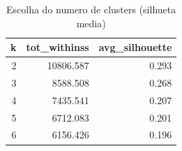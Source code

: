 \begin{table}

\caption{\label{tab:cluster_escolha_k}Escolha do numero de clusters (silhueta media)}
\centering
\begin{tabular}[t]{rrr}
\toprule
k & tot\_withinss & avg\_silhouette\\
\midrule
2 & 10806.587 & 0.293\\
3 & 8588.508 & 0.268\\
4 & 7435.541 & 0.207\\
5 & 6712.083 & 0.201\\
6 & 6156.426 & 0.196\\
\bottomrule
\end{tabular}
\end{table}
